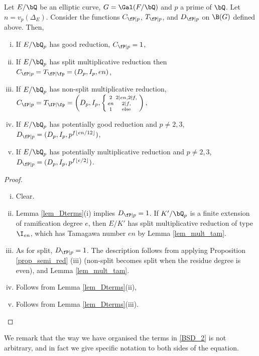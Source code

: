  \begin{prop}\label{prop_local_fns}
    Let $E / \bQ$ be an elliptic curve, $G = \Gal(F / \bQ)$ and $p$ a prime of $\bQ$. Let $n = v_p(\Delta_E)$. Consider the functions $C_{\fP \mid p}$, $T_{\fP \mid p}$, and $D_{\fP \mid p}$ on $\B(G)$ defined above. Then,
    \begin{enumerate}[(i)]
        \setlength\itemsep{0em}
        \item If $E / \bQ_p$ has good reduction, $C_{\fP \mid p} = 1$,
        \item If $E / \bQ_p$ has split multiplicative reduction then $C_{\fP \mid p} = T_{\fP \mid \fp} = (D_p, I_p, e n)$,
        \item If $E / \bQ_p$ has non-split multiplicative reduction, 
        $C_{\fP \mid p} = T_{\fP \mid \fp} = \left(D_p, I_p,
        \left\{\begin{smallmatrix}
            2   & 2 \mid en, 2 \nmid f,  \\
            en   &  2 \mid f, \\
            1   & \text{else}
        \end{smallmatrix}\right.\right),$ 
        \item If $E / \bQ_p$ has potentially good reduction and $p \not= 2, 3$, $D_{\fP \mid p} = (D_p, I_p, p^{f \floor{e n /12}})$, 
        \item If $E / \bQ_p$ has potentially multiplicative reduction and $p \not= 2, 3$, $D_{\fP \mid p} = (D_p, I_p, p^{f \floor{e / 2}})$.
    \end{enumerate}  
 \end{prop} 
 
 \begin{proof}
    \
\begin{enumerate}[(i)]
    \setlength\itemsep{0em}
    \item Clear. 
    \item Lemma \ref{lem_Dterms}(i) implies $D_{\fP \mid p} = 1$. If $K' / \bQ_p$ is a finite extension of ramification degree $e$, then $E / K'$ has split multiplicative reduction of type $\I_{en}$, which has Tamagawa number $en$ by Lemma \ref{lem_mult_tam}.
    \item As for split, $D_{\fP \mid p} = 1$. The description follows from applying Proposition \ref{prop_semi_red} (iii) (non-split becomes split when the residue degree is even), and Lemma \ref{lem_mult_tam}. 
    \item Follows from Lemma \ref{lem_Dterms}(ii),
    \item Follows from Lemma \ref{lem_Dterms}(iii).
\end{enumerate}
 \end{proof}
We remark that the way we have organised the terms in \eqref{BSD_2} is not arbitrary, and in fact we give specific notation to both sides of the equation. 

